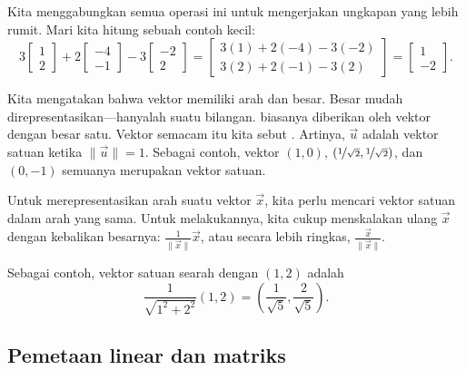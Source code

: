Kita menggabungkan semua operasi ini untuk mengerjakan ungkapan yang lebih rumit.
Mari kita hitung sebuah contoh kecil:
\begin{equation*}
3
\begin{bmatrix}
1 \\ 2
\end{bmatrix}
+
2
\begin{bmatrix}
-4 \\ -1
\end{bmatrix}
-
3
\begin{bmatrix}
-2 \\ 2
\end{bmatrix}
=
\begin{bmatrix}
3(1)+2(-4)-3(-2) \\ 3(2)+2(-1)-3(2)
\end{bmatrix}
=
\begin{bmatrix}
1 \\ -2
\end{bmatrix}
.
\end{equation*}

\medskip

Kita mengatakan bahwa vektor memiliki arah dan besar. Besar mudah
direpresentasikan---hanyalah suatu bilangan. \emph{} biasanya
diberikan oleh vektor dengan besar satu. Vektor semacam itu kita sebut
\emph{}. Artinya, $\vec{u}$ adalah vektor satuan ketika
$\lVert \vec{u} \rVert = 1$. Sebagai contoh, vektor $(1,0)$,
$(\nicefrac{1}{\sqrt{2}},\nicefrac{1}{\sqrt{2}})$, dan $(0,-1)$ semuanya merupakan
vektor satuan.

Untuk merepresentasikan arah suatu vektor $\vec{x}$, kita perlu mencari
vektor satuan dalam arah yang sama. Untuk melakukannya, kita cukup menskalakan ulang
$\vec{x}$ dengan kebalikan besarnya:
$\frac{1}{\lVert \vec{x} \rVert} \vec{x}$, atau secara lebih ringkas,
$\frac{\vec{x}}{\lVert \vec{x} \rVert}$.

Sebagai contoh, vektor satuan searah dengan $(1,2)$ adalah
\begin{equation*}
\frac{1}{\sqrt{1^2+2^2}} (1,2)
=
\left( \frac{1}{\sqrt{5}}, \frac{2}{\sqrt{5}} \right) .
\end{equation*}

\subsection{Pemetaan linear dan matriks}

